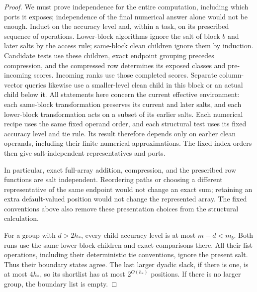 \documentclass[11pt]{article}
\numberwithin{equation}{section}
\theoremstyle{definition}
\theoremstyle{remark}
\begin{document}
\begin{proof}
We must prove independence for the entire computation, including which ports it exposes; independence of the final numerical answer alone would not be enough. Induct on the accuracy level and, within a task, on its prescribed sequence of operations.  Lower-block algorithms ignore the salt of block $b$ and
later salts by the access rule; same-block clean children ignore them
by induction.  Candidate tests use these children, exact endpoint
grouping precedes compression, and the compressed row determines its
exposed classes and pre-incoming scores.  Incoming ranks use those
completed scores.  Separate column-vector queries likewise use a
smaller-level clean child in this block or an actual child below it.
All statements here concern the current effective environment: each
same-block transformation preserves its current and later salts, and
each lower-block transformation acts on a subset of its earlier salts.
Each numerical recipe uses the same fixed operand
order, and each structural test uses its fixed accuracy level and tie
rule.  Its result therefore depends only on earlier clean operands,
including their finite numerical approximations.  The fixed index
orders then give salt-independent representatives and ports.

In particular, exact full-array addition, compression, and the prescribed
row functions are salt independent.  Reordering paths or choosing a
different representative of the same endpoint would not change an exact
sum; retaining an extra default-valued position would not change the
represented array.  The fixed conventions above also remove these
presentation choices from the structural calculation.

For a group with $d>2h_*$, every child accuracy level is at most ${m}-d<{m}_b$.
Both runs use the same lower-block children and exact comparisons there.
All their list operations, including their deterministic tie conventions,
ignore the present salt.  Thus their boundary states agree.  The last
larger dyadic slack, if there is one, is at most $4h_*$, so its shortlist
has at most $2^{O(h_*)}$ positions.  If there is no larger group, the
boundary list is empty.


\end{proof}
\end{document}
